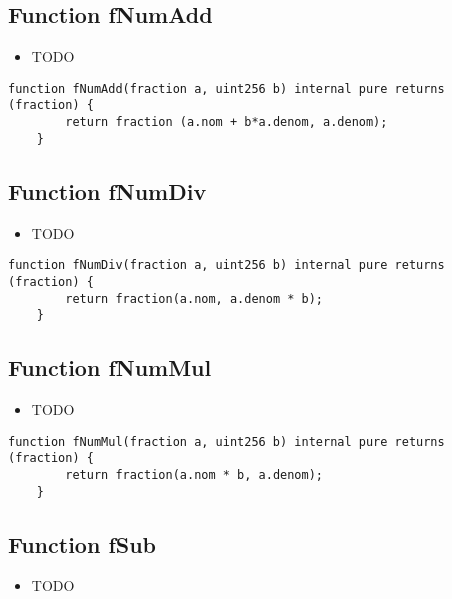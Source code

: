\subsection{Function fNumAdd}

\noindent\begin{itemize}
\item TODO
\end{itemize}

\begin{lstlisting}[firstnumber=37]
    function fNumAdd(fraction a, uint256 b) internal pure returns (fraction) {
        return fraction (a.nom + b*a.denom, a.denom);
    }
\end{lstlisting}

\subsection{Function fNumDiv}

\noindent\begin{itemize}
\item TODO
\end{itemize}

\begin{lstlisting}[firstnumber=25]
    function fNumDiv(fraction a, uint256 b) internal pure returns (fraction) {
        return fraction(a.nom, a.denom * b);
    }
\end{lstlisting}

\subsection{Function fNumMul}

\noindent\begin{itemize}
\item TODO
\end{itemize}

\begin{lstlisting}[firstnumber=21]
    function fNumMul(fraction a, uint256 b) internal pure returns (fraction) {
        return fraction(a.nom * b, a.denom);
    }
\end{lstlisting}

\subsection{Function fSub}

\noindent\begin{itemize}
\item TODO
\end{itemize}

